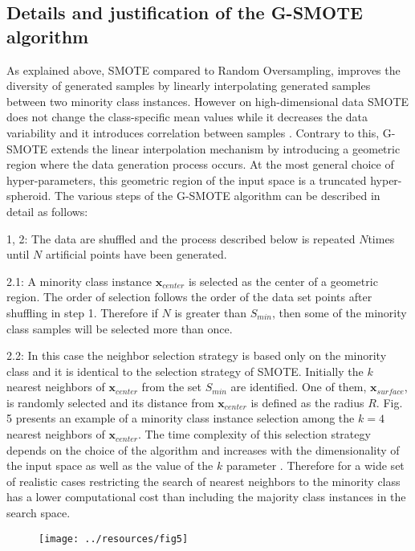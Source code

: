\documentclass[parskip=full]{scrartcl}
\begin{document}
\subsection{Details and justification of the G-SMOTE algorithm}

As explained above, SMOTE compared to Random Oversampling, improves the diversity of generated samples by linearly interpolating generated samples between two minority class instances. However on high-dimensional data SMOTE does not change the class-specific mean values while it decreases the data variability and it introduces correlation between samples \cite{Blagus2013}. Contrary to this, G-SMOTE extends the linear interpolation mechanism by introducing a geometric region where the data generation process occurs. At the most general choice of hyper-parameters, this geometric region of the input space is a truncated hyper-spheroid. The various steps of the G-SMOTE algorithm can be described in detail as follows:

1, 2: The data are shuffled and the process described below is repeated \( N \)times until \( N \) artificial points have been generated.

2.1: A minority class instance \( \textbf{x}_{center} \) is selected as the center of a geometric region. The order of selection follows the order of the data set points after shuffling in step 1. Therefore if \( N \) is greater than \( S_{min} \), then some of the minority class samples will be selected more than once.

2.2: In this case the neighbor selection strategy is based only on the minority class and it is identical to the selection strategy of SMOTE. Initially the \( k \) nearest neighbors of \( \textbf{x}_{center} \) from the set \( S_{min} \) are identified. One of them, \( \textbf{x}_{surface} \), is randomly selected and its distance from \( \textbf{x}_{center} \) is defined as the radius \( R \). Fig. 5 presents an example of a minority class instance selection among the \( k = 4 \ \) nearest neighbors of \( \textbf{x}_{center} \). The time complexity of this selection strategy depends on the choice of the algorithm and increases with the dimensionality of the input space as well as the value of the \( k \) parameter \cite{Vaidya1989}. Therefore for a wide set of realistic cases restricting the search of nearest neighbors to the minority class has a lower computational cost than including the majority class instances in the search space.

\begin{figure}[H]
	\centering
	\texttt{[image: ../resources/fig5]}
\end{figure}
\end{document}
